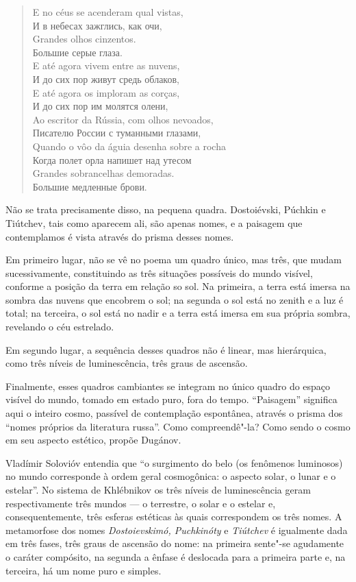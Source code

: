 \begin{verse}
E no céus se acenderam qual vistas, \\
И в небесах зажглись, как очи, \\[8pt]
Grandes olhos cinzentos. \\
Большие серые глаза. \\[8pt]
E até agora vivem entre as nuvens, \\
И до сих пор живут средь облаков, \\[8pt]
E até agora os imploram as corças, \\
И до сих пор им молятся олени, \\[8pt]
Ao escritor da Rússia, com olhos nevoados, \\
Писателю России с туманными глазами, \\[8pt]
Quando o vôo da águia desenha sobre a \qb{}rocha \\
Когда полет орла напишет над утесом \\[8pt]
Grandes sobrancelhas demoradas. \\
Большие медленные брови.
\end{verse}

Não se trata precisamente disso, na pequena quadra. Dostoiévski, Púchkin
e Tiútchev, tais como aparecem ali, são apenas nomes, e a paisagem que
contemplamos é vista através do prisma desses nomes.

Em primeiro lugar, não se vê no poema um quadro único, mas três, que
mudam sucessivamente, constituindo as três situações possíveis do mundo
visível, conforme a posição da terra em relação so sol. Na primeira, a
terra está imersa na sombra das nuvens que encobrem o sol; na segunda o
sol está no zenith e a luz é total; na terceira, o sol está no nadir e a
terra está imersa em sua própria sombra, revelando o céu estrelado.

Em segundo lugar, a sequência desses quadros não é linear, mas
hierárquica, como três níveis de luminescência, três graus de ascensão.

Finalmente, esses quadros cambiantes se integram no único quadro do
espaço visível do mundo, tomado em estado puro, fora do tempo.
``Paisagem'' significa aqui o inteiro cosmo, passível de contemplação
espontânea, através o prisma dos ``nomes próprios da literatura russa''.
Como compreendê"-la? Como sendo o cosmo em seu aspecto estético, propõe
Dugánov.

Vladímir Solovióv entendia que ``o surgimento do belo (os fenômenos
luminosos) no mundo corresponde à ordem geral cosmogônica: o aspecto
solar, o lunar e o estelar''. No sistema de Khlébnikov os três níveis de
luminescência geram respectivamente três mundos --- o terrestre, o solar
e o estelar e, consequentemente, três esferas estéticas às quais
correspondem os três nomes. A metamorfose dos nomes \emph{Dostoievskimó, 
Puchkinóty} e \emph{Tiútchev} é igualmente dada em três fases, três
graus de ascensão do nome: na primeira sente"-se agudamente o caráter
compósito, na segunda a ênfase é deslocada para a primeira parte e, na
terceira, há um nome puro e simples.


